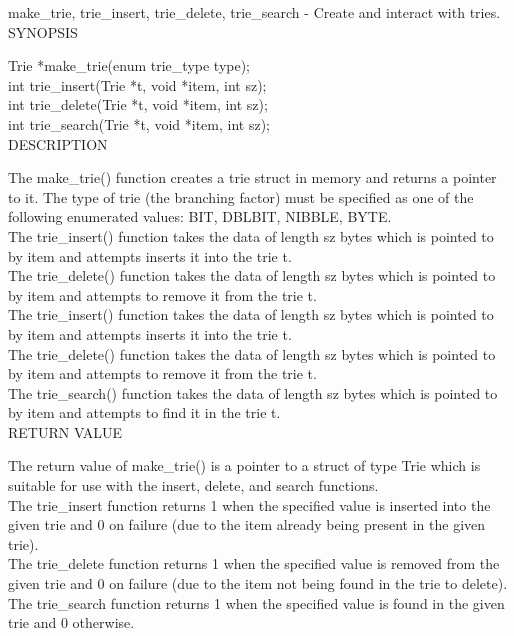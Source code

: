 \documentclass[11pt,onecolumn]{article}
\begin{document}
\noindent make\_trie, trie\_insert, trie\_delete, trie\_search - Create and interact with tries.\\

\noindent SYNOPSIS

\noindent Trie *make\_trie(enum trie\_type type);\\
int trie\_insert(Trie *t, void *item, int sz);\\
int trie\_delete(Trie *t, void *item, int sz);\\
int trie\_search(Trie *t, void *item, int sz);\\

\noindent DESCRIPTION

\noindent The make\_trie() function creates a trie struct in memory and returns a pointer to it. The type of trie (the branching factor) must be specified as one of the following enumerated values: BIT, DBLBIT, NIBBLE, BYTE.\\
The trie\_insert() function takes the data of length sz bytes which is pointed to by item and attempts inserts it into the trie t.\\
The trie\_delete() function takes the data of length sz bytes which is pointed to by item and attempts to remove it from the trie t.\\
The trie\_insert() function takes the data of length sz bytes which is pointed to by item and attempts inserts it into the trie t.\\
The trie\_delete() function takes the data of length sz bytes which is pointed to by item and attempts to remove it from the trie t.\\
The trie\_search() function takes the data of length sz bytes which is pointed to by item and attempts to find it in the trie t.\\

\noindent RETURN VALUE

\noindent The return value of make\_trie() is a pointer to a struct of type Trie which is suitable for use with the insert, delete, and search functions.\\
The trie\_insert function returns 1 when the specified value is inserted into the given trie and 0 on failure (due to the item already being present in the given trie).\\
The trie\_delete function returns 1 when the specified value is removed from the given trie and 0 on failure (due to the item not being found in the trie to delete).\\
The trie\_search function returns 1 when the specified value is found in the given trie and 0 otherwise.\\
\end{document}
